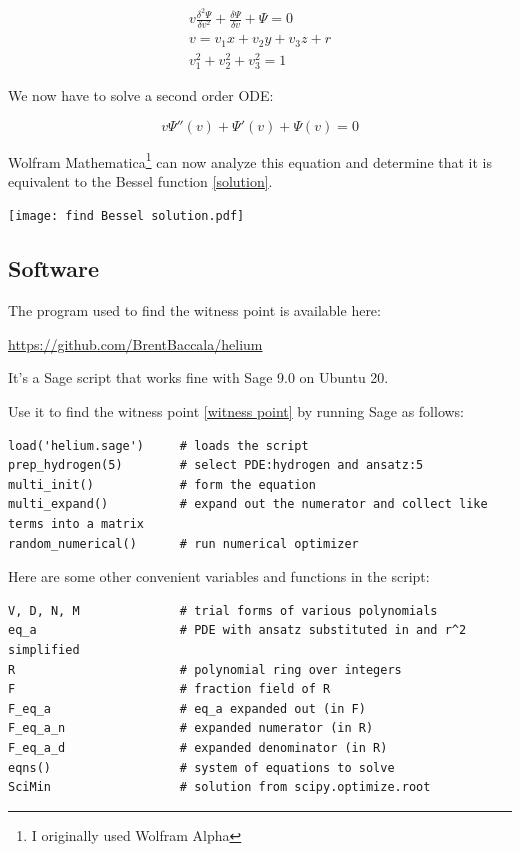 \documentclass{article}
\begin{document}
\begin{equation}
\label{related solution}
\begin{gathered}
v \frac{\delta^2\Psi}{\delta v^2} + \frac{\delta\Psi}{\delta v} + \Psi = 0 \\
v = v_1 x+ v_2 y+ v_3 z+r \\
v_1^2 + v_2^2 + v_3^2 = 1
\end{gathered}
\end{equation}

We now have to solve a second order ODE:

\begin{equation}
v \Psi''(v) + \Psi'(v) + \Psi(v) = 0
\end{equation}

Wolfram Mathematica\footnote{I originally used Wolfram Alpha} can now
analyze this equation and determine that it is equivalent
to the Bessel function \eqref{solution}.

\texttt{[image: find Bessel solution.pdf]}

\subsection*{Software}

The program used to find the witness point is available here:

\centerline{\url{https://github.com/BrentBaccala/helium}}

It's a Sage script that works fine with Sage 9.0 on Ubuntu 20.

Use it to find the witness point \eqref{witness point} by
running Sage as follows:

\begin{verbatim}
load('helium.sage')     # loads the script
prep_hydrogen(5)        # select PDE:hydrogen and ansatz:5
multi_init()            # form the equation
multi_expand()          # expand out the numerator and collect like terms into a matrix
random_numerical()      # run numerical optimizer
\end{verbatim}

Here are some other convenient variables and functions in the script:

\begin{verbatim}
V, D, N, M              # trial forms of various polynomials
eq_a                    # PDE with ansatz substituted in and r^2 simplified
R                       # polynomial ring over integers
F                       # fraction field of R
F_eq_a                  # eq_a expanded out (in F)
F_eq_a_n                # expanded numerator (in R)
F_eq_a_d                # expanded denominator (in R)
eqns()                  # system of equations to solve
SciMin                  # solution from scipy.optimize.root
\end{verbatim}
\end{document}
